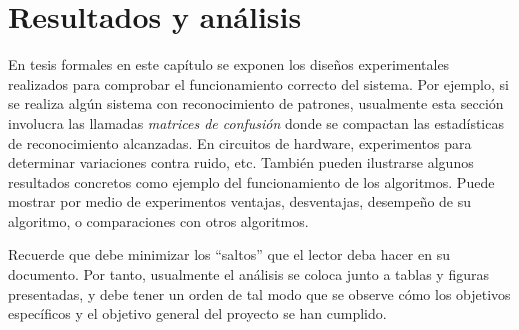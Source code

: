 \chapter{Resultados y análisis}

En tesis formales en este capítulo se exponen los diseños experimentales
realizados para comprobar el funcionamiento correcto del sistema. Por ejemplo,
si se realiza algún sistema con reconocimiento de patrones, usualmente esta
sección involucra las llamadas \emph{matrices de confusión} donde se compactan
las estadísticas de reconocimiento alcanzadas. En circuitos de hardware,
experimentos para determinar variaciones contra ruido, etc. También pueden
ilustrarse algunos resultados concretos como ejemplo del funcionamiento de los
algoritmos. Puede mostrar por medio de experimentos ventajas, desventajas,
desempeño de su algoritmo, o comparaciones con otros algoritmos.

Recuerde que debe minimizar los ``saltos'' que el lector deba hacer en su
documento. Por tanto, usualmente el análisis se coloca junto a tablas y figuras
presentadas, y debe tener un orden de tal modo que se observe cómo los
objetivos específicos y el objetivo general del proyecto se han cumplido.
